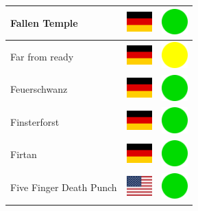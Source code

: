 \documentclass[12pt, a4paper, twoside]{report}
\begin{document}
\begin{center}
\begin{longtable}{|p{5cm}|p{2cm}|p{2cm}|}
			Fallen Temple & \includegraphics[width=1cm]{4x3/de} & \includegraphics[width=1cm]{likes/y} \\ \hline
			Far from ready & \includegraphics[width=1cm]{4x3/de} & \includegraphics[width=1cm]{likes/m} \\ \hline
			Feuerschwanz & \includegraphics[width=1cm]{4x3/de} & \includegraphics[width=1cm]{likes/y} \\ \hline
			Finsterforst & \includegraphics[width=1cm]{4x3/de} & \includegraphics[width=1cm]{likes/y} \\ \hline
			Firtan & \includegraphics[width=1cm]{4x3/de} & \includegraphics[width=1cm]{likes/y} \\ \hline
			Five Finger Death Punch & \includegraphics[width=1cm]{4x3/us} & \includegraphics[width=1cm]{likes/y} \\ \hline

\end{longtable}
\end{center}
\end{document}
